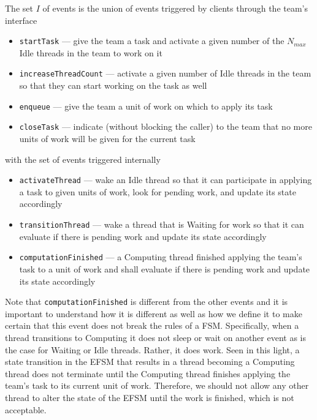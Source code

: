 \documentclass{article}
\begin{document}
The set $I$ of events is the union of events triggered by clients through the
team's interface
\begin{itemize}
\item{\texttt{startTask} --- give the team a task and activate a given number of the
$N_{max}$ Idle threads in the team to work on it}
\item{\texttt{increaseThreadCount} --- activate a given number of Idle threads in the
team so that they can start working on the task as well}
\item{\texttt{enqueue} --- give the team a unit of work on which to apply its
task}
\item{\texttt{closeTask} --- indicate (without blocking the caller) to the team
that no more units of work will be given for the current task}
\end{itemize}
with the set of events triggered internally
\begin{itemize}
\item{\texttt{activateThread} --- wake an Idle thread so that it can participate
in applying a task to given units of work, look for pending work, and update its
state accordingly}
\item{\texttt{transitionThread} --- wake a thread that is Waiting for work so
that it can evaluate if there is pending work and update its state accordingly}
\item{\texttt{computationFinished} --- a Computing thread finished applying the team's
task to a unit of work and shall evaluate if there is pending work and update
its state accordingly}
\end{itemize}

Note that \texttt{computationFinished} is different from the other events and it
is important to understand how it is different as well as how we define it to
make certain that this event does not break the rules of a FSM.  Specifically,
when a thread transitions to Computing it does not sleep or wait on another
event as is the case for Waiting or Idle threads.  Rather, it does work.  Seen
in this light, a state transition in the EFSM that results in a thread becoming
a Computing thread does not terminate until the Computing thread finishes
applying the team's task to its current unit of work.  Therefore, we should not
allow any other thread to alter the state of the EFSM until the work is
finished, which is not acceptable.\\
\end{document}
